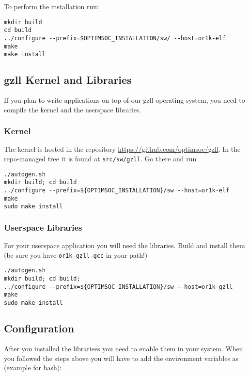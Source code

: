 
To perform the installation run:

\begin{lstlisting}
mkdir build
cd build
../configure --prefix=$OPTIMSOC_INSTALLATION/sw/ --host=or1k-elf
make
make install
\end{lstlisting}

\subsection{gzll Kernel and Libraries}

If you plan to write applications on top of our gzll operating system,
you need to compile the kernel and the userspace libraries.

\subsubsection{Kernel}

The kernel is hosted in the repository
\url{https://github.com/optimsoc/gzll}. In the repo-managed tree it is
found at \verb|src/sw/gzll|. Go there and run

\begin{lstlisting}
./autogen.sh
mkdir build; cd build
../configure --prefix=${OPTIMSOC_INSTALLATION}/sw --host=or1k-elf
make
sudo make install
\end{lstlisting}

\subsubsection{Userspace Libraries}

For your userspace application you will need the libraries. Build and
install them (be sure you have \verb|or1k-gzll-gcc| in your path!)

\begin{lstlisting}
./autogen.sh
mkdir build; cd build;
../configure --prefix=${OPTIMSOC_INSTALLATION}/sw --host=or1k-gzll
make
sudo make install
\end{lstlisting}

\subsection{Configuration}

After you installed the librariees you need to enable them in your
system. When you followed the steps above you will have to add the
environment variables as (example for bash):

